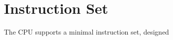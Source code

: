 \section{Instruction Set}
\label{sec:Instruction-Set}

The \simulator{} CPU supports a minimal instruction set, designed

\newpage
